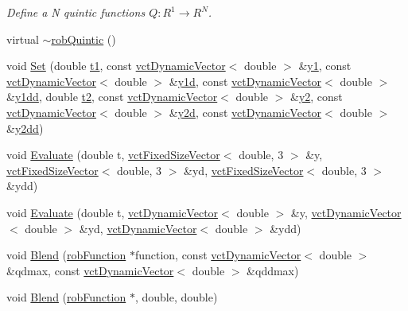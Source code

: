 \begin{DoxyCompactItemize}
\begin{DoxyCompactList}\small\item\em Define a N quintic functions $Q: R^1\rightarrow R^N $. \end{DoxyCompactList}\item 
virtual \hyperlink{classrob_quintic_afd7ccda65afd80f996b6a19d7a103215}{$\sim$rob\+Quintic} ()
\item 
void \hyperlink{classrob_quintic_a198c9a4ed3f2102c4c6120ce7ce4736e}{Set} (double \hyperlink{classrob_function_a9a4b408a3a5a8ae927caec3b6bac36ef}{t1}, const \hyperlink{classvct_dynamic_vector}{vct\+Dynamic\+Vector}$<$ double $>$ \&\hyperlink{classrob_function_rn_aadf26230a697fedca000dac29ae27129}{y1}, const \hyperlink{classvct_dynamic_vector}{vct\+Dynamic\+Vector}$<$ double $>$ \&\hyperlink{classrob_function_rn_a0cd776a1eec33965d8cdce69c7c12902}{y1d}, const \hyperlink{classvct_dynamic_vector}{vct\+Dynamic\+Vector}$<$ double $>$ \&\hyperlink{classrob_function_rn_a44e2cfac47df0d9324c0d7d6251d680f}{y1dd}, double \hyperlink{classrob_function_abf15c2d695ab4cc6336e19862327858f}{t2}, const \hyperlink{classvct_dynamic_vector}{vct\+Dynamic\+Vector}$<$ double $>$ \&\hyperlink{classrob_function_rn_a982a35e7e6f235da34765d3ceeb91109}{y2}, const \hyperlink{classvct_dynamic_vector}{vct\+Dynamic\+Vector}$<$ double $>$ \&\hyperlink{classrob_function_rn_a99d86533626d78aa644816936ec01ac2}{y2d}, const \hyperlink{classvct_dynamic_vector}{vct\+Dynamic\+Vector}$<$ double $>$ \&\hyperlink{classrob_function_rn_af67e2c772c0550231dd2b768adbae702}{y2dd})
\item 
void \hyperlink{classrob_quintic_a49a40ea0affa3211fa47efcf262f5ff1}{Evaluate} (double t, \hyperlink{classvct_fixed_size_vector}{vct\+Fixed\+Size\+Vector}$<$ double, 3 $>$ \&y, \hyperlink{classvct_fixed_size_vector}{vct\+Fixed\+Size\+Vector}$<$ double, 3 $>$ \&yd, \hyperlink{classvct_fixed_size_vector}{vct\+Fixed\+Size\+Vector}$<$ double, 3 $>$ \&ydd)
\item 
void \hyperlink{classrob_quintic_aecad785cf06ff420602efbbb7d602eda}{Evaluate} (double t, \hyperlink{classvct_dynamic_vector}{vct\+Dynamic\+Vector}$<$ double $>$ \&y, \hyperlink{classvct_dynamic_vector}{vct\+Dynamic\+Vector}$<$ double $>$ \&yd, \hyperlink{classvct_dynamic_vector}{vct\+Dynamic\+Vector}$<$ double $>$ \&ydd)
\item 
void \hyperlink{classrob_quintic_a83fae85b7d93b04a6f6c9e8332f5b42a}{Blend} (\hyperlink{classrob_function}{rob\+Function} $\ast$function, const \hyperlink{classvct_dynamic_vector}{vct\+Dynamic\+Vector}$<$ double $>$ \&qdmax, const \hyperlink{classvct_dynamic_vector}{vct\+Dynamic\+Vector}$<$ double $>$ \&qddmax)
\item 
void \hyperlink{classrob_quintic_a09de038bd1087310919def65ae7e0062}{Blend} (\hyperlink{classrob_function}{rob\+Function} $\ast$, double, double)
\end{DoxyCompactItemize}
